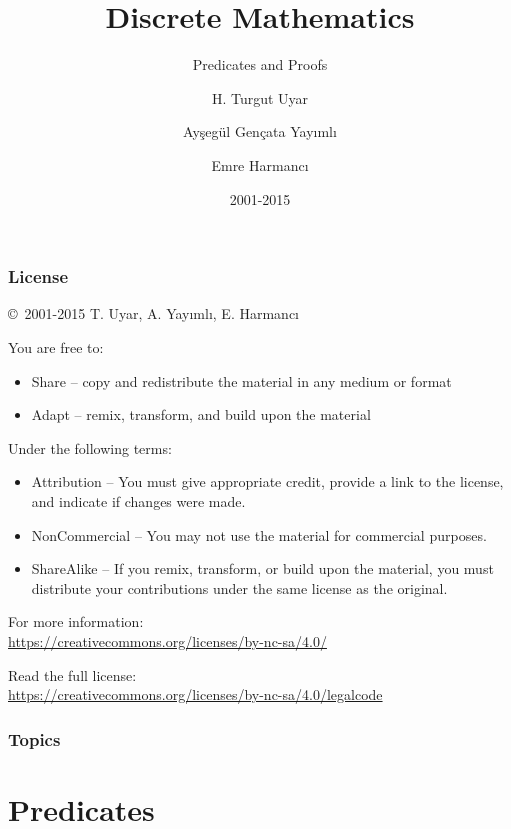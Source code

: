 \documentclass[dvipsnames]{beamer}
\title{Discrete Mathematics}
\subtitle{Predicates and Proofs}
\author{H. Turgut Uyar \and Ayşegül Gençata Yayımlı \and Emre Harmancı}
\date{2001-2015}
\begin{document}
\begin{frame}
  \titlepage
\end{frame}

\begin{frame}
  \frametitle{License}

  \hfill
  \copyright~2001-2015 T. Uyar, A. Yayımlı, E. Harmancı

  \vfill
  \begin{footnotesize}
    You are free to:
    \begin{itemize}
      \itemsep0em
      \item Share -- copy and redistribute the material in any medium or format
      \item Adapt -- remix, transform, and build upon the material
    \end{itemize}

    Under the following terms:
    \begin{itemize}
      \itemsep0em
      \item Attribution -- You must give appropriate credit, provide a link to
        the license, and indicate if changes were made.

      \item NonCommercial -- You may not use the material for commercial
        purposes.

      \item ShareAlike -- If you remix, transform, or build upon the material,
        you must distribute your contributions under the same license as the
        original.
    \end{itemize}
  \end{footnotesize}

  \begin{small}
    For more information:\\
    \url{https://creativecommons.org/licenses/by-nc-sa/4.0/}

    \smallskip
    Read the full license:\\
    \url{https://creativecommons.org/licenses/by-nc-sa/4.0/legalcode}
  \end{small}
\end{frame}

\begin{frame}
  \frametitle{Topics}
  \tableofcontents
\end{frame}

\section{Predicates}
\end{document}
